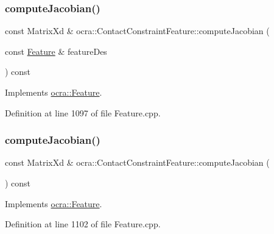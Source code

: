 \subsubsection{\texorpdfstring{compute\+Jacobian()}{computeJacobian()}\hspace{0.1cm}{\footnotesize\ttfamily [1/2]}}
{\footnotesize\ttfamily const Matrix\+Xd \& ocra\+::\+Contact\+Constraint\+Feature\+::compute\+Jacobian (\begin{DoxyParamCaption}\item[{const \hyperlink{classocra_1_1Feature}{Feature} \&}]{feature\+Des }\end{DoxyParamCaption}) const\hspace{0.3cm}{\ttfamily [virtual]}}



Implements \hyperlink{classocra_1_1Feature_a4fb8eeeed978a1f727ec43cd1bd18d78}{ocra\+::\+Feature}.



Definition at line 1097 of file Feature.\+cpp.

\hypertarget{classocra_1_1ContactConstraintFeature_aa3c6131d9c4c815e9e9ec5ab50407b21}{}\label{classocra_1_1ContactConstraintFeature_aa3c6131d9c4c815e9e9ec5ab50407b21} 
\subsubsection{\texorpdfstring{compute\+Jacobian()}{computeJacobian()}\hspace{0.1cm}{\footnotesize\ttfamily [2/2]}}
{\footnotesize\ttfamily const Matrix\+Xd \& ocra\+::\+Contact\+Constraint\+Feature\+::compute\+Jacobian (\begin{DoxyParamCaption}{ }\end{DoxyParamCaption}) const\hspace{0.3cm}{\ttfamily [virtual]}}



Implements \hyperlink{classocra_1_1Feature_adbab3b388657555abb805bb971c2491f}{ocra\+::\+Feature}.



Definition at line 1102 of file Feature.\+cpp.

\hypertarget{classocra_1_1ContactConstraintFeature_ac4dec3a5defe2c50e6084d49a1838883}{}\label{classocra_1_1ContactConstraintFeature_ac4dec3a5defe2c50e6084d49a1838883} 
